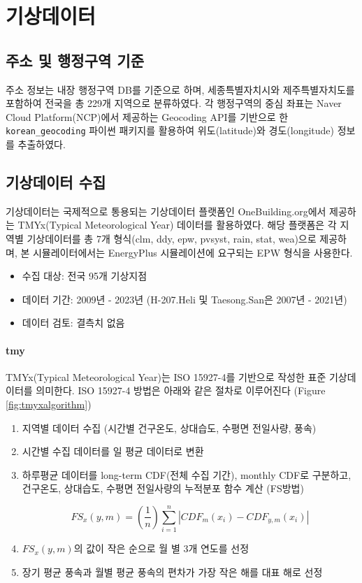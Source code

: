\section{기상데이터} \label{section:weather-data}
\subsection{주소 및 행정구역 기준}
주소 정보는 내장 행정구역 DB를 기준으로 하며, 세종특별자치시와 제주특별자치도를 포함하여 전국을 총 229개 지역으로 분류하였다.
각 행정구역의 중심 좌표는 Naver Cloud Platform(NCP)에서 제공하는 Geocoding API를 기반으로 한 \texttt{korean\_geocoding} 파이썬 패키지를 활용하여 위도(latitude)와 경도(longitude) 정보를 추출하였다.

\subsection{기상데이터 수집}
기상데이터는 국제적으로 통용되는 기상데이터 플랫폼인 OneBuilding.org\cite{onebuilding2025}에서 제공하는 TMYx(Typical Meteorological Year) 데이터를 활용하였다. 해당 플랫폼은 각 지역별 기상데이터를 총 7개 형식(clm, ddy, epw, pvsyst, rain, stat, wea)으로 제공하며, 본 시뮬레이터에서는 EnergyPlus 시뮬레이션에 요구되는 EPW 형식을 사용한다.
\begin{itemize}
  \item 수집 대상: 전국 95개 기상지점
  \item 데이터 기간: 2009년 - 2023년 (H-207.Heli 및 Taesong.San은 2007년 - 2021년)
  \item 데이터 검토: 결측치 없음
\end{itemize}
\paragraph{tmy} TMYx(Typical Meteorological Year)는 ISO 15927-4를 기반으로 작성한 표준 기상데이터를 의미한다. ISO 15927-4 방법은 아래와 같은 절차로 이루어진다\cite{shimtmyx} (Figure \ref{fig:tmyxalgorithm})
\begin{enumerate}
  \item 지역별 데이터 수집 (시간별 건구온도, 상대습도, 수평면 전일사량, 풍속)
  \item 시간별 수집 데이터를 일 평균 데이터로 변환
  \item 하루평균 데이터를 long-term CDF(전체 수집 기간), monthly CDF로 구분하고, 건구온도, 상대습도, 수평면 전일사량의 누적분포 함수 계산 (FS방법)
  
\[ 
  FS_{x}(y,m) = \left(\frac{1}{n}\right) \sum_{i=1}^{n} |CDF_{m}(x_{i}) - CDF_{y,m}(x_{i})|
\]

  \item $FS_{x}(y,m)$의 값이 작은 순으로 월 별 3개 연도를 선정
  \item 장기 평균 풍속과 월별 평균 풍속의 편차가 가장 작은 해를 대표 해로 선정
\end{enumerate}

